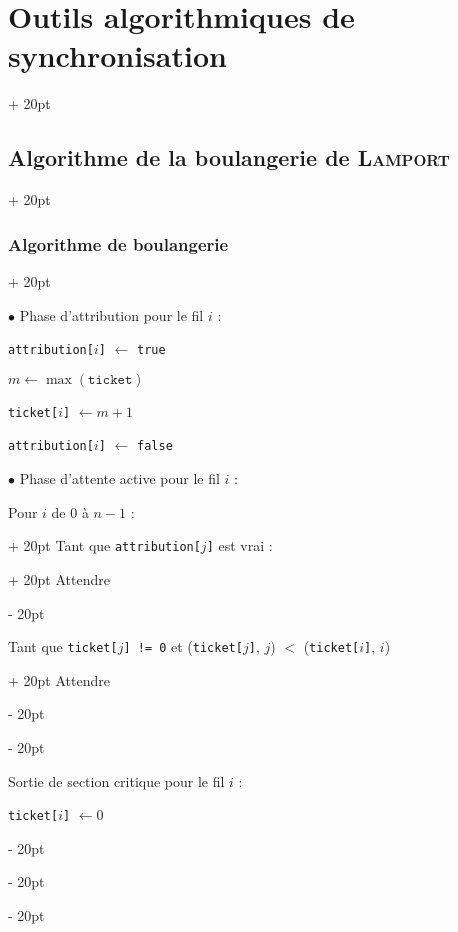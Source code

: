 \documentclass[a4paper, 12pt, twoside]{article}
\newcommand{\ind}[1][20pt]{\advance\leftskip + #1}
\newcommand{\deind}[1][20pt]{\advance\leftskip - #1}
\newenvironment{indt}[2][20pt]{#2 \par \ind[#1]}{\par \deind} %
\begin{document}
\begin{indt}{\section{Outils algorithmiques de synchronisation}}
\begin{indt}{\subsection{Algorithme de la boulangerie de \textsc{Lamport}}}
\begin{indt}{\subsubsection{Algorithme de boulangerie}}
                \vspace{6pt}
                
                $\bullet$ Phase d'attribution pour le fil $i$ :

                \begin{emphBox}
                    \texttt{attribution[$i$]} $\leftarrow$ \texttt{true}

                    $m \leftarrow \max(\mathtt{ticket})$

                    \texttt{ticket[$i$]} $\leftarrow m + 1$

                    \texttt{attribution[$i$]} $\leftarrow$ \texttt{false}
                \end{emphBox}

                \vspace{6pt}
                
                $\bullet$ Phase d'attente active pour le fil $i$ :

                \begin{emphBox}
                    \begin{indt}{Pour $i$ de 0 à $n - 1$ :}
                        \begin{indt}{Tant que \texttt{attribution[$j$]} est vrai :}
                            Attendre
                        \end{indt}

                        \vspace{6pt}
                        
                        \begin{indt}{Tant que \texttt{ticket[$j$] != 0} et (\texttt{ticket[$j$]}, $j$) $<$ (\texttt{ticket[$i$]}, $i$)}
                            Attendre
                        \end{indt}
                    \end{indt}
                \end{emphBox}

                \vspace{6pt}
                
                Sortie de section critique pour le fil $i$ :

                \begin{emphBox}
                    \texttt{ticket[$i$]} $\leftarrow 0$
                \end{emphBox}
            \end{indt}


\end{indt}
\end{indt}
\end{document}
